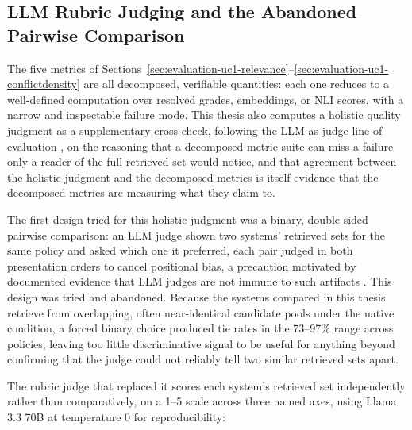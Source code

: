 \subsection{LLM Rubric Judging and the Abandoned Pairwise Comparison}
\label{sec:evaluation-uc1-rubric}

The five metrics of Sections~\ref{sec:evaluation-uc1-relevance}--\ref{sec:evaluation-uc1-conflictdensity}
are all decomposed, verifiable quantities: each one reduces to a well-defined computation over
resolved grades, embeddings, or NLI scores, with a narrow and inspectable failure mode. This thesis
also computes a holistic quality judgment as a supplementary cross-check, following the
LLM-as-judge line of evaluation \cite{zheng2023judging,liu2023geval}, on the reasoning that a
decomposed metric suite can miss a failure only a reader of the full retrieved set would notice, and
that agreement between the holistic judgment and the decomposed metrics is itself evidence that the
decomposed metrics are measuring what they claim to.

The first design tried for this holistic judgment was a binary, double-sided pairwise comparison: an
LLM judge shown two systems' retrieved sets for the same policy and asked which one it preferred,
each pair judged in both presentation orders to cancel positional bias, a precaution motivated by
documented evidence that LLM judges are not immune to such artifacts
\cite{wang2024fair,panickssery2024selfpref}. This design was tried and abandoned. Because the
systems compared in this thesis retrieve from overlapping, often near-identical candidate pools
under the native condition, a forced binary choice produced tie rates in the 73--97\% range across
policies, leaving too little discriminative signal to be useful for anything beyond confirming that
the judge could not reliably tell two similar retrieved sets apart.

The rubric judge that replaced it scores each system's retrieved set independently rather than
comparatively, on a 1--5 scale across three named axes, using Llama 3.3 70B \cite{grattafiori2024llama3}
at temperature 0 for reproducibility:

